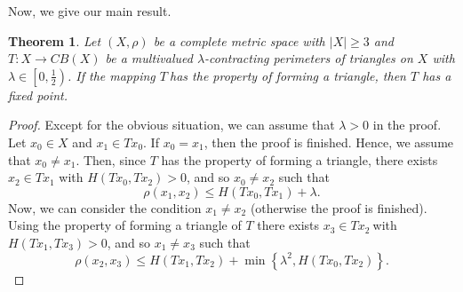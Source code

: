 \documentclass[reqno,11pt]{amsart}
\newtheorem{theorem}{Theorem}
\theoremstyle{plain}
\numberwithin{equation}{section}
\begin{document}
Now, we give our main result.

\begin{theorem}
\label{Theo1}Let $\left( X,\rho \right) $ be a complete metric space with $%
\left \vert X\right \vert \geq 3$ and $T:X\rightarrow CB(X)$ be a
multivalued $\lambda $-contracting perimeters of triangles on $X$ with $%
\lambda \in \left[ 0,\frac{1}{2}\right) $. If the mapping $T~$has the
property of forming a triangle, then $T$ has a fixed point.
\end{theorem}

\begin{proof}
Except for the obvious situation, we can assume that $\lambda >0$ in the
proof. Let $x_{0}\in X$ and $x_{1}\in Tx_{0}$. If $x_{0}=x_{1}$, then the
proof is finished. Hence, we assume that $x_{0}\neq x_{1}$. Then, since $T$
has the property of forming a triangle, there exists $x_{2}\in Tx_{1}$ with $%
H(Tx_{0},Tx_{2})>0$, and so $x_{0}\neq x_{2}$ such that 
\begin{equation}
\rho (x_{1},x_{2})\leq H(Tx_{0},Tx_{1})+\lambda .  \label{E1}
\end{equation}%
Now, we can consider the condition $x_{1}\neq x_{2}$ (otherwise the proof is
finished). Using the property of forming a triangle of $T$ there exists $%
x_{3}\in Tx_{2}~$with $H(Tx_{1},Tx_{3})>0$, and so $x_{1}\neq x_{3}$ such
that 
\begin{equation}
\rho (x_{2},x_{3})\leq H(Tx_{1},Tx_{2})+\min \left \{ \lambda
^{2},H(Tx_{0},Tx_{2})\right \} .  \label{E2}
\end{equation}


\end{proof}
\end{document}
